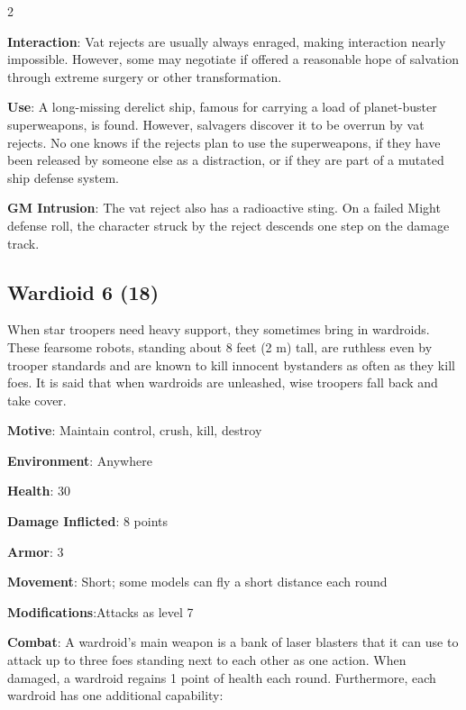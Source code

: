 \begin{multicols}{2} 

\textbf{Interaction}: Vat rejects are usually always enraged, making interaction nearly impossible. However, some may negotiate if offered a reasonable hope of salvation through extreme surgery or other transformation.

\textbf{Use}: A long-missing derelict ship, famous for carrying a load of planet-buster superweapons, is found. However, salvagers discover it to be overrun by vat rejects. No one knows if the rejects plan to use the superweapons, if they have been released by someone else as a distraction, or if they are part of a mutated ship defense system.

\textbf{GM Intrusion}: The vat reject also has a radioactive sting. On a failed Might defense roll, the character struck by the reject descends one step on the damage track.

\subsection{Wardioid	6 (18)}

When star troopers need heavy support, they sometimes bring in wardroids. These fearsome robots, standing about 8 feet (2 m) tall, are ruthless even by trooper standards and are known to kill innocent bystanders as often as they kill foes. It is said that when wardroids are unleashed, wise troopers fall back and take cover.

\textbf{Motive}: Maintain control, crush, kill, destroy

\textbf{Environment}: Anywhere

\textbf{Health}: 30

\textbf{Damage Inflicted}: 8 points

\textbf{Armor}: 3

\textbf{Movement}: Short; some models can fly a short distance each round

\textbf{Modifications}:Attacks as level 7

\textbf{Combat}: A wardroid’s main weapon is a bank of laser blasters that it can use to attack up to three foes standing next to each other as one action. When damaged, a wardroid regains 1 point of health each round. Furthermore, each wardroid has one additional capability:

\end{multicols}


